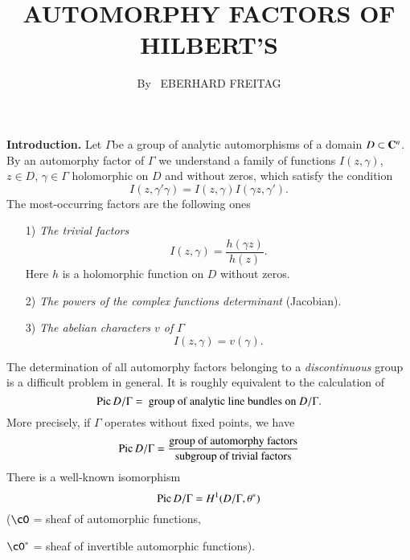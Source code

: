 
\title{AUTOMORPHY FACTORS OF HILBERT'S}

\author{By~ EBERHARD FREITAG}

\date{}
\maketitle

\setcounter{page}{9}
\setcounter{pageoriginal}{8}

\noindent
\textbf{Introduction.}
Let $\Gamma$\pageoriginale be a group of analytic automorphisms of a domain $D \subset \mathbf{C}^n$. By an automorphy factor of $\Gamma$ we understand a family of functions $I(z,\gamma)$, $z \in D$, $\gamma \in \Gamma$ holomorphic on $D$ and without zeros, which satisfy the condition
$$
I(z, \gamma' \gamma) = I (z,\gamma) I (\gamma z, \gamma').
$$
The most-occurring factors are the following ones
\begin{enumerate}
\item[1)] \textit{The trivial factors}
$$
I (z, \gamma) = \frac{h(\gamma z)}{h(z)}.
$$
Here $h$ is a holomorphic function on $D$ without zeros.

\item[2)] {\it The powers of the complex functions determinant} (Jacobian).

\item[3)] {\it The abelian characters $v$ of $\Gamma$}
$$
I(z, \gamma) = v(\gamma).
$$
\end{enumerate}
The determination of all automorphy factors belonging to a \textit{discontinuous} group is a difficult problem in general. It is roughly equivalent to the calculation of 
$$
\operatorname{Pic} D/\Gamma = \text{ group of analytic line bundles on $D/\Gamma$}.
$$
More precisely, if $\Gamma$ operates without fixed points, we have
$$
\operatorname{Pic} D/\Gamma = \frac{\text{group of automorphy factors}}{\text{subgroup of trivial factors}}
$$
There is a well-known isomorphism
$$
\operatorname{Pic} D/\Gamma=H^1 (D/\Gamma, \theta^\ast)
$$
($\cO$ = sheaf of automorphic functions,

\noindent
$\cO^\ast$ = sheaf of invertible automorphic functions).

